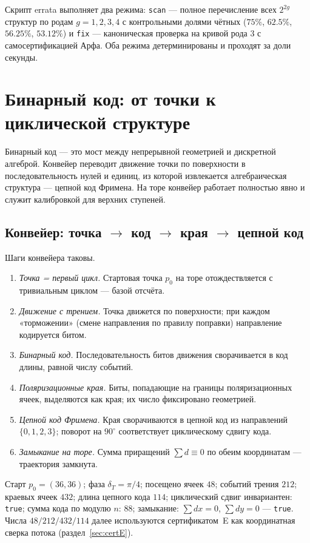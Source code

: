 Скрипт errata выполняет два режима: \texttt{scan} — полное перечисление
всех $2^{2g}$ структур по родам $g=1,2,3,4$ с контрольными долями
чётных ($75\%$, $62.5\%$, $56.25\%$, $53.12\%$) и \texttt{fix} —
каноническая проверка на кривой рода $3$ с самосертификацией Арфа.
Оба режима детерминированы и проходят за доли секунды.

\section{Бинарный код: от точки к циклической структуре}\label{sec:binary}

Бинарный код — это мост между непрерывной геометрией и дискретной
алгеброй. Конвейер переводит движение точки по поверхности в
последовательность нулей и единиц, из которой извлекается алгебраическая
структура — цепной код Фримена. На торе конвейер работает полностью
явно и служит калибровкой для верхних ступеней.

\subsection{Конвейер: точка $\to$ код $\to$ края $\to$ цепной код}

Шаги конвейера таковы.
\begin{enumerate}[leftmargin=2.2em]
\item \emph{Точка = первый цикл.} Стартовая точка $p_0$ на торе
  отождествляется с тривиальным циклом — базой отсчёта.
\item \emph{Движение с трением.} Точка движется по поверхности;
  при каждом «торможении» (смене направления по правилу поправки)
  направление кодируется битом.
\item \emph{Бинарный код.} Последовательность битов движения
  сворачивается в код длины, равной числу событий.
\item \emph{Поляризационные края.} Биты, попадающие на границы
  поляризационных ячеек, выделяются как края; их число фиксировано
  геометрией.
\item \emph{Цепной код Фримена.} Края сворачиваются в цепной код из
  направлений $\{0,1,2,3\}$; поворот на $90^\circ$ соответствует
  циклическому сдвигу кода.
\item \emph{Замыкание на торе.} Сумма приращений $\sum d\equiv0$
  по обеим координатам — траектория замкнута.
\end{enumerate}

\begin{databox}
Старт $p_0=(36,36)$; фаза $\delta_T=\pi/4$; посещено ячеек $48$;
событий трения $212$; краевых ячеек $432$; длина цепного кода $114$;
циклический сдвиг инвариантен: \texttt{true}; сумма кода по модулю
$n$: $88$; замыкание: $\sum dx=0$, $\sum dy=0$ — \texttt{true}.
Числа $48/212/432/114$ далее используются сертификатом~E как
координатная сверка потока (раздел~\ref{sec:certE}).
\end{databox}

